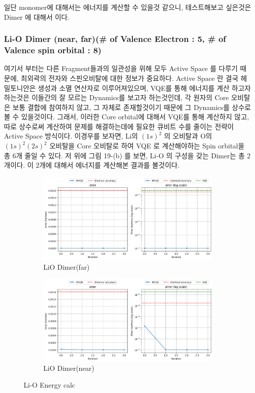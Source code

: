 \documentclass[11pt]{article}
\begin{document}
일단 monomer에 대해서는 에너지를 계산할 수 있을것 같으니, 테스트해보고 싶은것은 Dimer 에 대해서 이다. 
\subsubsection{Li-O Dimer (near, far)(\# of Valence Electron : 5, \# of Valence spin orbital : 8)}
여기서 부터는 다른 Fragment들과의 일관성을 위해 모두 Active Space 를 다루기 때문에, 최외곽의 전자와 스핀오비탈에 대한 정보가 중요하다. 
Active Space 란 결국 헤밀토니안은 생성과 소멸 연산자로 이루어져있으며, VQE를 통해 에너지를 계산 하고자하는것은 이들간의 잘 모르는 Dynamics를 보고자 하는것인데, 
각 원자의 Core 오비탈은 보통 결합에 참여하지 않고, 그 자체로 존재할것이기 때문에 그 Dynamics를 상수로 볼 수 있을것이다. 그래서, 이러한 Core orbital에 대해서 
VQE를 통해 계산하지 않고, 따로 상수로써 계산하여 문제를 해결하는데에 필요한 큐비트 수를 줄이는 전략이 Active Space 방식이다. 
이경우를 보자면, Li의 \((1s)^{2}\) 의 오비탈과 O의 \((1s)^{2}(2s)^{2}\) 오비탈을 Core 오비탈로 하여 VQE 로 계산해야하는 Spin orbital을 총 6개 줄일 수 있다. 
저 위에 그림 19-(b) 를 보면, Li-O 의 구성을 갖는 Dimer는 총 2개이다. 이 2개에 대해서 에너지를 계산해본 결과를 볼것이다. 
\begin{figure}[H]
  \centering
  \begin{subfigure}[b]{0.45\textwidth}
    \includegraphics[width=\textwidth]{fig/LiO_far.png}
    \caption{LiO Dimer(far)}
    \label{fig:first}
  \end{subfigure}
  \hfill
  \vrule width 1pt  %
  \hfill
  \begin{subfigure}[b]{0.45\textwidth}
    \includegraphics[width=\textwidth]{fig/LiO_near.png}
    \caption{LiO Dimer(near)}
    \label{fig:second}
  \end{subfigure}
  \caption{Li-O Energy calc}
  \label{fig:two_figures_side_by_side}
\end{figure}
\end{document}
